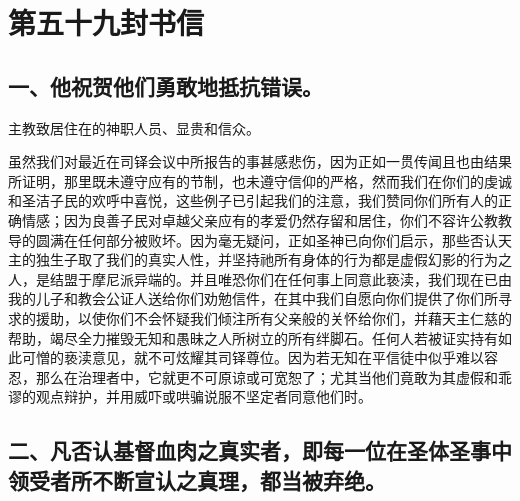 
\section{第五十九封书信}

\par


\subsection{一、他祝贺他们勇敢地抵抗错误。}

主教致居住在的神职人员、显贵和信众。\par

虽然我们对最近在司铎会议中所报告的事甚感悲伤，因为正如一贯传闻且也由结果所证明，那里既未遵守应有的节制，也未遵守信仰的严格，然而我们在你们的虔诚和圣洁子民的欢呼中喜悦，这些例子已引起我们的注意，我们赞同你们所有人的正确情感；因为良善子民对卓越父亲应有的孝爱仍然存留和居住，你们不容许公教教导的圆满在任何部分被败坏。因为毫无疑问，正如圣神已向你们启示，那些否认天主的独生子取了我们的真实人性，并坚持祂所有身体的行为都是虚假幻影的行为之人，是结盟于摩尼派异端的。并且唯恐你们在任何事上同意此亵渎，我们现在已由我的儿子和教会公证人送给你们劝勉信件，在其中我们自愿向你们提供了你们所寻求的援助，以使你们不会怀疑我们倾注所有父亲般的关怀给你们，并藉天主仁慈的帮助，竭尽全力摧毁无知和愚昧之人所树立的所有绊脚石。任何人若被证实持有如此可憎的亵渎意见，就不可炫耀其司铎尊位。因为若无知在平信徒中似乎难以容忍，那么在治理者中，它就更不可原谅或可宽恕了；尤其当他们竟敢为其虚假和乖谬的观点辩护，并用威吓或哄骗说服不坚定者同意他们时。\par


\subsection{二、凡否认基督血肉之真实者，即每一位在圣体圣事中领受者所不断宣认之真理，都当被弃绝。}

